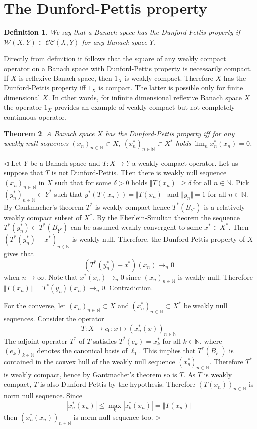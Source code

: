 \documentclass[12pt]{article}
\newtheorem{theorem}{Theorem}
\newtheorem{definition}[theorem]{Definition}
\newenvironment{proof}{\par $\triangleleft$}{$\triangleright$}
\begin{document}
\section{The Dunford-Pettis property}

\begin{definition} We say that a Banach space has the Dunford-Pettis property if $\mathcal{W}(X,Y)\subset \mathcal{CC}(X,Y)$ for any Banach space $Y$.
\end{definition}

Directly from definition it follows that the square of any weakly compact operator on a Banach space with Dunford-Pettis property is necessarily compact. If $X$ is reflexive Banach space, then $1_X$ is weakly compact. Therefore $X$ has the  Dunford-Pettis property iff $1_X$ is compact. The latter is possible only for finite dimensional $X$. In other words, for infinite dimensional reflexive Banach space $X$ the operator $1_X$ provides an example of weakly compact but not completely continuous operator.

\begin{theorem} A Banach space $X$ has the Dunford-Pettis property iff for any weakly null sequences $(x_n)_{n\in\mathbb{N}}\subset X$, $(x_n^*)_{n\in\mathbb{N}}\subset X^*$ holds $\lim_n x_n^*(x_n)=0$.
\end{theorem}
\begin{proof} Let $Y$ be a Banach space and $T:X\to Y$ a weakly compact operator.
Let us suppose that $T$ is not Dunford-Pettis. Then there is weakly null sequence $(x_n)_{n\in\mathbb{N}}$ in $X$ such that for some $\delta>0$ holds $\Vert T(x_n)\Vert\geq \delta$ for all $n\in\mathbb{N}$. Pick $(y_n^*)_{n\in\mathbb{N}}\subset Y^*$ such that $y^*(T(x_n))=\Vert T(x_n)\Vert$ and $\Vert y_n\Vert=1$ for all $n\in\mathbb{N}$. By Gantmacher’s theorem $T^*$ is weakly compact hence $T^*(B_{Y^*})$ is a relatively weakly compact subset of $X^*$. By the Eberlein-Smulian theorem the sequence $T^*(y_n^*)\subset T^*(B_{Y^*})$ can be assumed weakly convergent to some $x^*\in X^*$. Then $(T^*(y_n^*)-x^*)_{n\in\mathbb{N}}$ is weakly null. Therefore, the Dunford-Pettis property of $X$ gives that
$$
(T^*(y_n^*)-x^*)(x_n)\to_n 0
$$
when $n\to\infty$. Note that $x^*(x_n)\to_n 0$ since $(x_n)_{n\in\mathbb{N}}$ is weakly null. Therefore $\Vert T(x_n)\Vert=T^*(y_n)(x_n)\to_n 0$. Contradiction.

For the converse, let $(x_n)_{n\in\mathbb{N}}\subset X$ and $(x_n^*)_{n\in\mathbb{N}}\subset X^*$ be weakly null sequences. Consider the operator
$$
T:X \to c_0: x\mapsto (x_n^*(x))_{n\in\mathbb{N}}
$$
The adjoint operator $T^*$ of $T$ satisfies $T^*(e_k)=x_k^*$ for all $k\in\mathbb{N}$, where $(e_k)_{k\in\mathbb{N}}$ denotes the canonical basis of $\ell_1$. This implies that $T^*(B_{\ell_1})$ is contained in the convex hull of the weakly null sequence $(x_n^*)_{n\in\mathbb{N}}$. Therefore $T^*$ is weakly compact, hence by Gantmacher’s theorem so is $T$. As $T$ is weakly compact, $T$ is also Dunford-Pettis by the hypothesis. Therefore $(T(x_n))_{n\in\mathbb{N}}$ is norm null sequence. Since
$$
|x_n^*(x_n)|\leq\max_k |x_k^*(x_n)|=\Vert T(x_n)\Vert
$$
then $(x_n^*(x_n))_{n\in\mathbb{N}}$ is norm null sequence too.
\end{proof}
\end{document}
